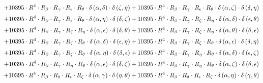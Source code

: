\begin{subequations}
\begin{gather}
 \\[0.2em] \notag 		 + 10395 \cdot R^{4} \cdot R_{\beta{}} \cdot R_{\gamma{}} \cdot R_{\epsilon{}} \cdot R_{\theta{}} \cdot \delta{}\left(\alpha{}, \delta{}\right) \cdot \delta{}\left(\zeta{}, \eta{}\right)+ 10395 \cdot R^{4} \cdot R_{\beta{}} \cdot R_{\gamma{}} \cdot R_{\epsilon{}} \cdot R_{\theta{}} \cdot \delta{}\left(\alpha{}, \zeta{}\right) \cdot \delta{}\left(\delta{}, \eta{}\right) 
 \\[0.2em] \notag 		 + 10395 \cdot R^{4} \cdot R_{\beta{}} \cdot R_{\gamma{}} \cdot R_{\epsilon{}} \cdot R_{\theta{}} \cdot \delta{}\left(\alpha{}, \eta{}\right) \cdot \delta{}\left(\delta{}, \zeta{}\right)+ 10395 \cdot R^{4} \cdot R_{\beta{}} \cdot R_{\gamma{}} \cdot R_{\zeta{}} \cdot R_{\eta{}} \cdot \delta{}\left(\alpha{}, \delta{}\right) \cdot \delta{}\left(\epsilon{}, \theta{}\right) 
 \\[0.2em] \notag 		 + 10395 \cdot R^{4} \cdot R_{\beta{}} \cdot R_{\gamma{}} \cdot R_{\zeta{}} \cdot R_{\eta{}} \cdot \delta{}\left(\alpha{}, \epsilon{}\right) \cdot \delta{}\left(\delta{}, \theta{}\right)+ 10395 \cdot R^{4} \cdot R_{\beta{}} \cdot R_{\gamma{}} \cdot R_{\zeta{}} \cdot R_{\eta{}} \cdot \delta{}\left(\alpha{}, \theta{}\right) \cdot \delta{}\left(\delta{}, \epsilon{}\right) 
 \\[0.2em] \notag 		 + 10395 \cdot R^{4} \cdot R_{\beta{}} \cdot R_{\gamma{}} \cdot R_{\zeta{}} \cdot R_{\theta{}} \cdot \delta{}\left(\alpha{}, \delta{}\right) \cdot \delta{}\left(\epsilon{}, \eta{}\right)+ 10395 \cdot R^{4} \cdot R_{\beta{}} \cdot R_{\gamma{}} \cdot R_{\zeta{}} \cdot R_{\theta{}} \cdot \delta{}\left(\alpha{}, \epsilon{}\right) \cdot \delta{}\left(\delta{}, \eta{}\right) 
 \\[0.2em] \notag 		 + 10395 \cdot R^{4} \cdot R_{\beta{}} \cdot R_{\gamma{}} \cdot R_{\zeta{}} \cdot R_{\theta{}} \cdot \delta{}\left(\alpha{}, \eta{}\right) \cdot \delta{}\left(\delta{}, \epsilon{}\right)+ 10395 \cdot R^{4} \cdot R_{\beta{}} \cdot R_{\gamma{}} \cdot R_{\eta{}} \cdot R_{\theta{}} \cdot \delta{}\left(\alpha{}, \delta{}\right) \cdot \delta{}\left(\epsilon{}, \zeta{}\right) 
 \\[0.2em] \notag 		 + 10395 \cdot R^{4} \cdot R_{\beta{}} \cdot R_{\gamma{}} \cdot R_{\eta{}} \cdot R_{\theta{}} \cdot \delta{}\left(\alpha{}, \epsilon{}\right) \cdot \delta{}\left(\delta{}, \zeta{}\right)+ 10395 \cdot R^{4} \cdot R_{\beta{}} \cdot R_{\gamma{}} \cdot R_{\eta{}} \cdot R_{\theta{}} \cdot \delta{}\left(\alpha{}, \zeta{}\right) \cdot \delta{}\left(\delta{}, \epsilon{}\right) 
 \\[0.2em] \notag 		 + 10395 \cdot R^{4} \cdot R_{\beta{}} \cdot R_{\delta{}} \cdot R_{\epsilon{}} \cdot R_{\zeta{}} \cdot \delta{}\left(\alpha{}, \gamma{}\right) \cdot \delta{}\left(\eta{}, \theta{}\right)+ 10395 \cdot R^{4} \cdot R_{\beta{}} \cdot R_{\delta{}} \cdot R_{\epsilon{}} \cdot R_{\zeta{}} \cdot \delta{}\left(\alpha{}, \eta{}\right) \cdot \delta{}\left(\gamma{}, \theta{}\right) 

\end{gather}
\end{subequations}

